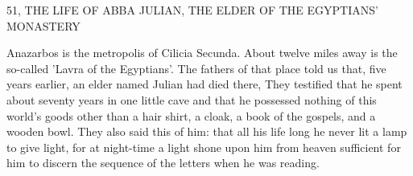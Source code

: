 51, THE LIFE OF ABBA JULIAN,
THE ELDER OF THE EGYPTIANS' MONASTERY

Anazarbos is the metropolis of Cilicia Secunda.
About twelve miles
away is the so-called 'Lavra of the Egyptians'.
The fathers of that
place told us that, five years earlier, an elder named Julian had died
there, They testified that he spent about seventy years in one little
cave and that he possessed nothing of this world's goods other than
a hair shirt, a cloak, a book of the gospels, and a wooden bowl.
They also said this of him: that all his life long he never lit a lamp
to give light, for at night-time a light shone upon him from heaven
sufficient for him to discern the sequence of the letters when he was
reading.

